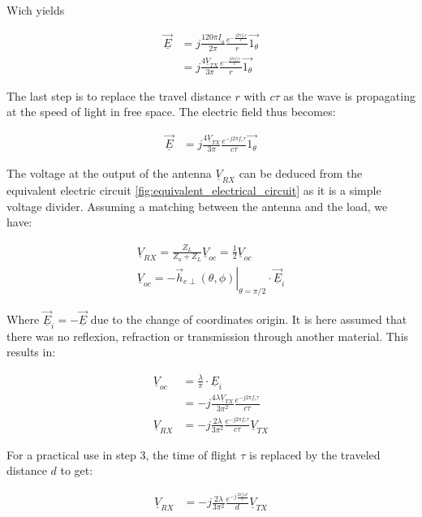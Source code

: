 \documentclass[10pt,a4paper]{ULBreport}
\begin{document}
Wich yields

\begin{align*}
    \underline{\vec{E}} &= j \frac{120\pi\underline{I}_a}{2\pi} \frac{e^{-\frac{j2\pi f_c r}{c}}}{r} \vec{1_{\theta}}\\
    &= j \frac{4\underline{V}_{TX}}{3\pi} \frac{e^{-\frac{j2\pi f_c r}{c}}}{r} \vec{1_{\theta}}
\end{align*}

The last step is to replace the travel distance $r$ with $c \tau$ as the wave is propagating at the speed of light in free space. The electric field thus becomes:

\begin{align*}
    \underline{\vec{E}} &= j \frac{4 \underline{V}_{TX}}{3\pi} \frac{e^{-j2\pi f_c \tau}}{c\tau} \vec{1_{\theta}}
\end{align*}

The voltage at the output of the antenna $\underline{V}_{RX}$ can be deduced from the equivalent electric circuit \ref{fig:equivalent_electrical_circuit} as it is a simple voltage divider. Assuming a matching between the antenna and the load, we have:

\begin{align*}
    \underline{V}_{RX} = \frac{Z_L}{Z_a + Z_L} \underline{V}_{oc} = \frac{1}{2} \underline{V}_{oc}\\
    \underline{V}_{oc} = -\left . \vec{h}_{e\perp}(\theta, \phi)\right\vert_{\theta = \pi/2} \cdot \underline{\vec{E}}_i
\end{align*}

Where $\underline{\vec{E}}_i = - \underline{\vec{E}}$ due to the change of coordinates origin. It is here assumed that there was no reflexion, refraction or transmission through another material. This results in:

\begin{align*}
    \underline{V}_{oc} &= \frac{\lambda}{\pi} \cdot \underline{E}_i\\
    &= -j\frac{4  \lambda \underline{V}_{TX}}{3\pi^2}\frac{e^{-j 2\pi f_c \tau}}{c\tau}\\
    \underline{V}_{RX} &= -j\frac{2  \lambda }{3\pi^2}\frac{e^{-j 2\pi f_c \tau}}{c\tau}\underline{V}_{TX}
\end{align*}

For a practical use in step 3, the time of flight $\tau$ is replaced by the traveled distance $d$ to get:

\begin{align}
    \underline{V}_{RX} &= -j\frac{2 \lambda }{3\pi^2}\frac{e^{-j\frac{2\pi f_c d}{c}}}{d}\underline{V}_{TX}
    \label{eq:voltage_RX}
\end{align}
\end{document}
